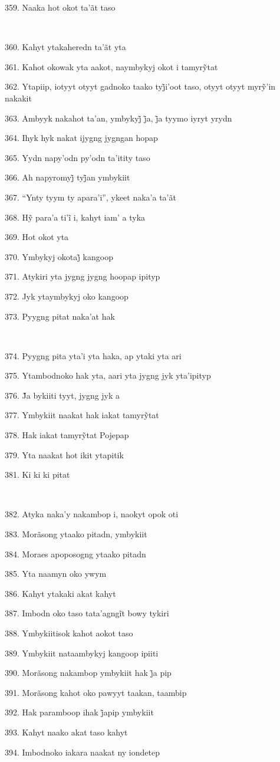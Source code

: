 359. Naaka hot okot ta'ãt taso

~

360. Kahyt ytakaheredn ta'ãt yta

361. Kahot okowak yta aakot, naymbykyj okot i tamyrỹtat

362. Ytapiip, iotyyt otyyt gadnoko taako tyj̃i’oot taso, otyyt otyyt myrỹ’in nakakit

363. Ambyyk nakahot ta’an, ymbykyj̃ j̃a, j̃a tyymo iyryt yrydn

364. Ihyk hyk nakat ijygng jygngan hopap

365. Yydn napy'odn py'odn ta'itity taso

366. Ah napyromyj̃ tyj̃an ymbykiit

367. ``Ynty tyym ty apara'i'', ykeet naka'a ta'ãt

368. Hỹ para’a ti’ĩ i, kahyt iam’ a tyka

369. Hot okot yta

370. Ymbykyj okotaj̃ kangoop

371. Atykiri yta jygng jygng hoopap ipityp

372. Jyk ytaymbykyj oko kangoop

373. Pyygng pitat naka'at hak

~

374. Pyygng pita yta'i yta haka, ap ytaki yta ari

375. Ytambodnoko hak yta, aari yta jygng jyk yta'ipityp

376. J̃a bykiiti tyyt, jygng jyk a

377. Ymbykiit naakat hak iakat tamyrỹtat

378. Hak iakat tamyrỹtat Pojepap

379. Yta naakat hot ikit ytapitik

381. Ki ki ki pitat

~

382. Atyka naka'y nakambop i, naokyt opok oti

383. Morãsong ytaako pitadn, ymbykiit

384. Moraes apoposogng ytaako pitadn

385. Yta naamyn oko ywym

386. Kahyt ytakaki akat kahyt

387. Imbodn oko taso tata’agngĩt bowy tykiri

388. Ymbykiitisok kahot aokot taso

389. Ymbykiit nataambykyj kangoop ipiiti

390. Morãsong nakambop ymbykiit hak j̃a pip

391. Morãsong kahot oko pawyyt taakan, taambip

392. Hak paramboop ihak j̃apip ymbykiit

393. Kahyt naako akat taso kahyt

394. Imbodnoko iakara naakat ny iondetep

\endgroup

